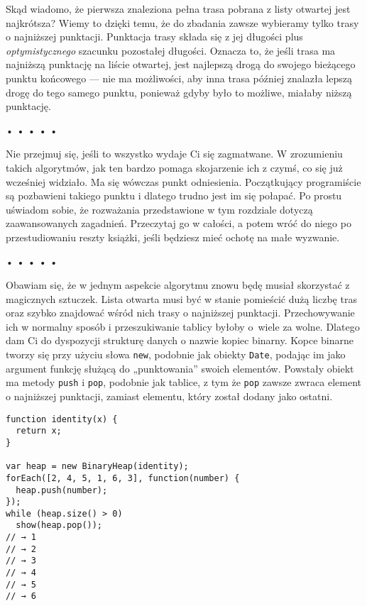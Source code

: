   
Skąd wiadomo, że pierwsza znaleziona pełna trasa pobrana z listy otwartej jest najkrótsza? Wiemy to dzięki temu, że do zbadania zawsze wybieramy tylko trasy o najniższej punktacji. Punktacja trasy składa się z jej długości plus \emph{optymistycznego} szacunku pozostałej długości. Oznacza to, że jeśli trasa ma najniższą punktację na liście otwartej, jest najlepszą drogą do swojego bieżącego punktu końcowego — nie ma możliwości, aby inna trasa później znalazła lepszą drogę do tego samego punktu, ponieważ gdyby było to możliwe, miałaby niższą punktację.



\begin{center}
• • • • •
\end{center}

  
Nie przejmuj się, jeśli to wszystko wydaje Ci się zagmatwane. W zrozumieniu takich algorytmów, jak ten bardzo pomaga skojarzenie ich z czymś, co się już wcześniej widziało. Ma się wówczas punkt odniesienia. Początkujący programiście są pozbawieni takiego punktu i dlatego trudno jest im się połapać. Po prostu uświadom sobie, że rozważania przedstawione w tym rozdziale dotyczą zaawansowanych zagadnień. Przeczytaj go w całości, a potem wróć do niego po przestudiowaniu reszty książki, jeśli będziesz mieć ochotę na małe wyzwanie.



\begin{center}
• • • • •
\end{center}

  
Obawiam się, że w jednym aspekcie algorytmu znowu będę musiał skorzystać z magicznych sztuczek. Lista otwarta musi być w stanie pomieścić dużą liczbę tras oraz szybko znajdować wśród nich trasy o najniższej punktacji. Przechowywanie ich w normalny sposób i przeszukiwanie tablicy byłoby o~wiele za wolne. Dlatego dam Ci do dyspozycji strukturę danych o nazwie kopiec binarny. Kopce binarne tworzy się przy użyciu słowa \texttt{new}, podobnie jak obiekty \texttt{Date}, podając im jako argument funkcję służącą do „punktowania” swoich elementów. Powstały obiekt ma metody \texttt{push} i \texttt{pop}, podobnie jak tablice, z tym że \texttt{pop} zawsze zwraca element o najniższej punktacji, zamiast elementu, który został dodany jako ostatni.

  
\begin{verbatim} 
function identity(x) {
  return x;
}

var heap = new BinaryHeap(identity);
forEach([2, 4, 5, 1, 6, 3], function(number) {
  heap.push(number);
});
while (heap.size() > 0)
  show(heap.pop());
// → 1
// → 2
// → 3
// → 4
// → 5
// → 6
\end{verbatim}
  
